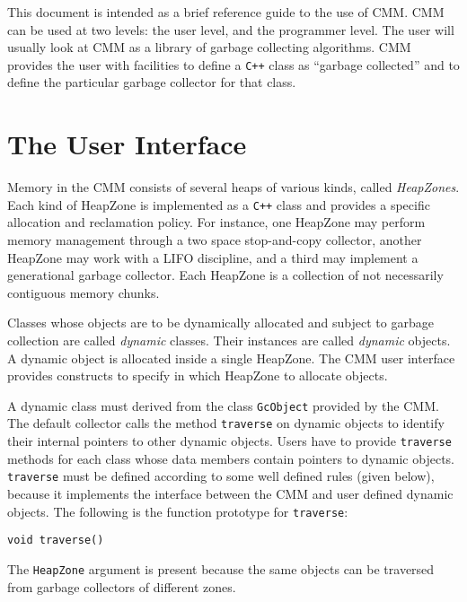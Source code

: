 This document is intended as a brief reference guide to the use
of CMM.  CMM can be used at two levels: the user level, and the
programmer level.  The user will usually look at CMM as a library of
garbage collecting algorithms.  CMM provides the user with facilities to
define a \verb|C++| class as ``garbage collected'' and to define the 
particular garbage collector for that class.

\section {The User Interface}

Memory in the CMM consists of several heaps of various kinds, called {\em
HeapZones}.  Each kind of HeapZone is implemented as a {\tt C++} class and
provides a specific allocation and reclamation policy.  For instance, one
HeapZone may perform memory management through a two space stop-and-copy
collector, another HeapZone may work with a LIFO discipline, and a third may
implement a generational garbage collector.  Each HeapZone is a collection of
not necessarily contiguous memory chunks.

Classes whose objects are to be dynamically allocated and subject to garbage
collection are called {\em dynamic\/} classes.  Their instances are called {\em
dynamic\/} objects.  A dynamic object is allocated inside a single HeapZone.
The CMM user interface provides constructs to specify in which HeapZone to
allocate objects.


A dynamic class must derived from the class {\tt GcObject} provided by the CMM.
The default collector calls the method {\tt traverse} on dynamic objects to
identify their internal pointers to other dynamic objects.  Users have to
provide {\tt traverse} methods for each class whose data members contain
pointers to dynamic objects.  {\tt traverse} must be defined according to some
well defined rules (given below), because it implements the interface between
the CMM and user defined dynamic objects.  The following is the function
prototype for {\tt traverse}:
\begin{verbatim}
void traverse()
\end{verbatim}
The {\tt HeapZone} argument is present because the same objects can be
traversed from garbage collectors of different zones.

